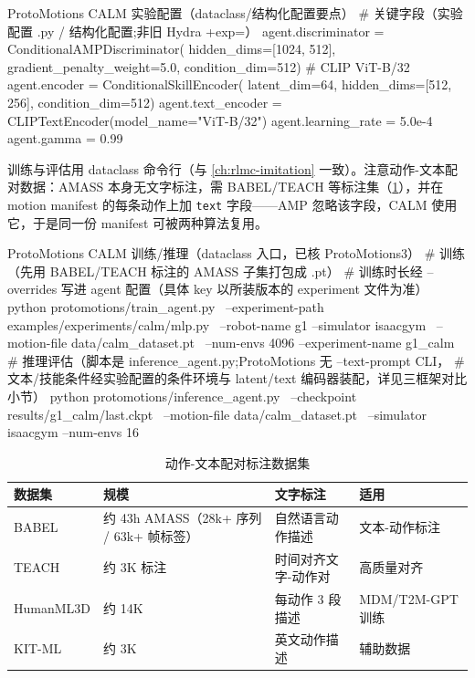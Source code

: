 \begin{codebox}[Python]{ProtoMotions CALM 实验配置（dataclass/结构化配置要点）}
# 关键字段（实验配置 .py / 结构化配置;非旧 Hydra +exp=）
agent.discriminator = ConditionalAMPDiscriminator(
    hidden_dims=[1024, 512], gradient_penalty_weight=5.0,
    condition_dim=512)                       # CLIP ViT-B/32
agent.encoder = ConditionalSkillEncoder(
    latent_dim=64, hidden_dims=[512, 256], condition_dim=512)
agent.text_encoder = CLIPTextEncoder(model_name="ViT-B/32")
agent.learning_rate = 5.0e-4
agent.gamma = 0.99
\end{codebox}

训练与评估用 dataclass 命令行（与 \cref{ch:rlmc-imitation} 一致）。注意动作-文本配对数据：AMASS 本身无文字标注，需 BABEL/TEACH 等标注集（\cref{tab:rlmc-mm-textdata}），并在 motion manifest 的每条动作上加 \verb|text| 字段——AMP 忽略该字段，CALM 使用它，于是同一份 manifest 可被两种算法复用。

\begin{codebox}[bash]{ProtoMotions CALM 训练/推理（dataclass 入口，已核 ProtoMotions3）}
# 训练（先用 BABEL/TEACH 标注的 AMASS 子集打包成 .pt）
# 训练时长经 --overrides 写进 agent 配置（具体 key 以所装版本的 experiment 文件为准）
python protomotions/train_agent.py \
    --experiment-path examples/experiments/calm/mlp.py \
    --robot-name g1 --simulator isaacgym \
    --motion-file data/calm_dataset.pt \
    --num-envs 4096 --experiment-name g1_calm
# 推理评估（脚本是 inference_agent.py;ProtoMotions 无 --text-prompt CLI，
#   文本/技能条件经实验配置的条件环境与 latent/text 编码器装配，详见三框架对比小节）
python protomotions/inference_agent.py \
    --checkpoint results/g1_calm/last.ckpt \
    --motion-file data/calm_dataset.pt \
    --simulator isaacgym --num-envs 16
\end{codebox}

\begin{table}[ht]
\centering
\small
\caption{动作-文本配对标注数据集}
\label{tab:rlmc-mm-textdata}
\begin{tabular}{@{}llll@{}}
\toprule
数据集 & 规模 & 文字标注 & 适用 \\
\midrule
BABEL & 约 43h AMASS（28k+ 序列 / 63k+ 帧标签） & 自然语言动作描述 & 文本-动作标注 \\
TEACH & 约 3K 标注 & 时间对齐文字-动作对 & 高质量对齐 \\
HumanML3D & 约 14K & 每动作 3 段描述 & MDM/T2M-GPT 训练 \\
KIT-ML & 约 3K & 英文动作描述 & 辅助数据 \\
\bottomrule
\end{tabular}
\end{table}

